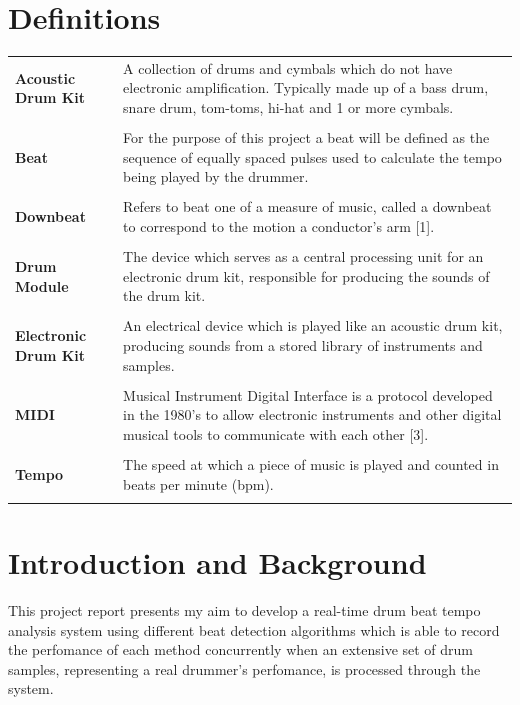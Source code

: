 \documentclass[a4paper, 11pt]{article}
\begin{document}
\section*{Definitions}
\begin{tabular}{l p{4.5in}  }\\
\textbf{Acoustic Drum Kit} & A collection of drums and cymbals which do not have electronic amplification. Typically made up of a bass drum, snare drum, tom-toms, hi-hat and 1 or more cymbals.\\\\
\textbf{Beat} & For the purpose of this project a beat will be defined as the sequence of equally spaced pulses used to calculate the tempo being played by the drummer.\\\\
\textbf{Downbeat} & Refers to beat one of a measure of music, called a downbeat to correspond to the motion a conductor's arm [1].\\\\
\textbf{Drum Module} & The device which serves as a central processing unit for an electronic drum kit, responsible for producing the sounds of the drum kit.\\\\
\textbf{Electronic Drum Kit} & An electrical device which is played like an acoustic drum kit, producing sounds from a stored library of instruments and samples.\\\\
\textbf{MIDI} & Musical Instrument Digital Interface is a protocol developed in the 1980's to allow electronic instruments and other digital musical tools to communicate with each other [3].\\\\
\textbf{Tempo} & The speed at which a piece of music is played \cite{oxford-comp} and counted in beats per minute (bpm).\\\\
\end{tabular}
\clearpage

\maketitle{} \section{Introduction and Background}

This project report presents my aim to develop a real-time drum beat tempo analysis system using different beat detection algorithms which is able to record the perfomance of each method concurrently when an extensive set of drum samples, representing a real drummer's perfomance, is processed through the system.
\end{document}
